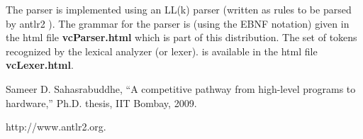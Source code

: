 \documentclass{article}
\begin{document}
The parser is implemented using 
an LL(k) parser (written as rules to be parsed by antlr2 \cite{ref:antlr2}).
The grammar for the parser is (using the EBNF notation) given in 
the html file {\bf vcParser.html} which is part of this distribution. 
The set of tokens recognized by the lexical analyzer (or lexer).
is available in the html file {\bf vcLexer.html}.

\begin{thebibliography}{99}
Sameer D. Sahasrabuddhe,
``A competitive pathway from high-level programs to hardware,''
Ph.D. thesis, IIT Bombay, 2009.

http://www.antlr2.org.
\end{thebibliography}
\end{document}
